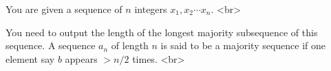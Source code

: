 You are given a sequence of $n$ integers $x_1, x_2 \cdots x_n$. <br>

You need to output the length of the longest majority subsequence of this sequence. A sequence $a_n$ of length $n$ is said to be 
a majority sequence if one element say $b$ appears $ > n/2$ times.
<br>
